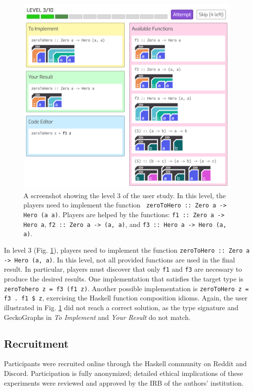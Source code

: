 \documentclass[preprint,12pt]{elsarticle}
\begin{document}
\begin{figure}[!h]
  \includegraphics[width=\linewidth]{figures/Level3}
  \caption{\label{fig:level3} A screenshot showing the level 3 of the user study.  In this level, the players need to implement the function \texttt{ zeroToHero :: Zero a -> Hero (a a)}. Players are helped by the functions: {\tt f1 :: Zero a -> Hero a}, {\tt f2 :: Zero a -> (a, a)}, and {\tt f3 :: Hero a -> Hero (a, a)}.}
\end{figure}


In level 3 (Fig. \ref{fig:level3}),  players need to implement the function {\tt zeroToHero :: Zero a -> Hero (a, a)}.  In this level, not all provided functions are used in the final result. In particular,  players must discover that only \texttt{f1} and \texttt{f3} are necessary to produce the desired results. One implementation that satisfies the target type is \texttt{zeroTohero z = f3 (f1 z)}. Another possible implementation is {\tt zeroToHero z = f3 . f1 \$ z}, exercising the Haskell function composition idioms. Again, the user illustrated in Fig. \ref{fig:level3} did not reach a correct solution, as the type signature and GeckoGraphs in {\it To Implement} and {\it Your Result} do not match.



\subsection{Recruitment}
Participants were recruited online through the Haskell community on Reddit and Discord. Participation is fully anonymized; detailed ethical implications of these experiments were reviewed and approved by the IRB of the authors' institution.
\end{document}
